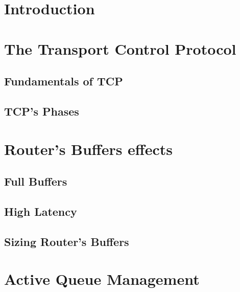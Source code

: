 \documentclass[letter, 11pt]{article}
\theoremstyle{plain}
\theoremstyle{definition}
\begin{document}




\newpage
\printglossary

\newpage
\tableofcontents
\listoffigures
\listoftables

\newpage

\doublespacing
\section{Introduction}


\newpage

\section{The Transport Control Protocol}


\subsection{Fundamentals of TCP}


\subsection{TCP's Phases }


\newpage

\section{Router's Buffers effects}

\subsection{Full Buffers}

\subsection{High Latency}

\subsection{Sizing Router's Buffers}


\newpage

\section{Active Queue Management}

\end{document}

